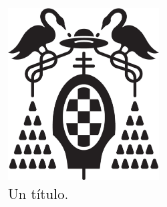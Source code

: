 \documentclass[12pt,oneside,a4paper]{article}
\begin{document}
\begin{figure}
  \centering
  \includegraphics[width=4cm]{figuras/logo-uah.eps}
  \caption{Un título.}
  \label{fig:ejemplo}
\end{figure}




\end{document}
